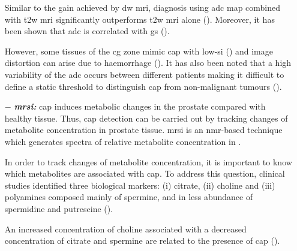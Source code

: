 \begin{enumerate}[leftmargin=*]
Similar to the gain achieved by \ac{dw} \ac{mri}, diagnosis using \ac{adc} map combined with \ac{t2w} \ac{mri} significantly outperforms \ac{t2w} \ac{mri} alone (\cite{Doo2012,Choi2007}). Moreover, it has been shown that \ac{adc} is correlated with \ac{gs} (\cite{Hambrock2011, Itou2011, Peng2013}).

However, some tissues of the \ac{cg} zone mimic \ac{cap} with low-\ac{si} (\cite{Kirkham2006}) and image distortion can arise due to haemorrhage (\cite{Choi2007}). It has also been noted that a high variability of the \ac{adc} occurs between different patients making it difficult to define a static threshold to distinguish \ac{cap} from non-malignant tumours (\cite{Choi2007}).

\item[$-$] \textbf{\textit{\ac{mrsi}:}} \ac{cap} induces metabolic changes in the prostate compared with healthy tissue. Thus, \ac{cap} detection can be carried out by tracking changes of metabolite concentration in prostate tissue. \ac{mrsi} is an \ac{nmr}-based technique which generates spectra of relative metabolite concentration in .

In order to track changes of metabolite concentration, it is important to know which metabolites are associated with \ac{cap}. To address this question, clinical studies identified three biological markers: (i) citrate, (ii) choline and (iii) polyamines composed mainly of spermine, and in less abundance of spermidine and putrescine (\cite{Awwad2012,Costello2006,Giskeodegard2013}). 

An increased concentration of choline associated with a decreased concentration of citrate and spermine are related to the presence of \ac{cap} (\cite{Awwad2012,Costello2006,Graaf2000,Giskeodegard2013}).




\end{enumerate}

